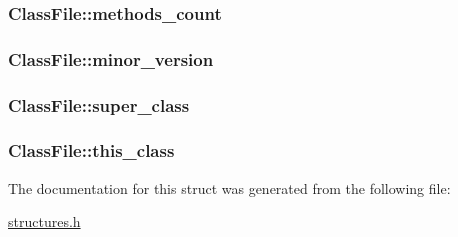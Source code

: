 \subsubsection[{\texorpdfstring{methods\+\_\+count}{methods_count}}]{ Class\+File\+::methods\+\_\+count}\hypertarget{structClassFile_aacfb45d4af64216324b1ae5269c870d5}{}\label{structClassFile_aacfb45d4af64216324b1ae5269c870d5}
\subsubsection[{\texorpdfstring{minor\+\_\+version}{minor_version}}]{ Class\+File\+::minor\+\_\+version}\hypertarget{structClassFile_af0db7b0ea01cb9cea2cee177ca81df09}{}\label{structClassFile_af0db7b0ea01cb9cea2cee177ca81df09}
\subsubsection[{\texorpdfstring{super\+\_\+class}{super_class}}]{ Class\+File\+::super\+\_\+class}\hypertarget{structClassFile_a5f6c11c0ccb02fd992b5c102725253ec}{}\label{structClassFile_a5f6c11c0ccb02fd992b5c102725253ec}
\subsubsection[{\texorpdfstring{this\+\_\+class}{this_class}}]{ Class\+File\+::this\+\_\+class}\hypertarget{structClassFile_a2d33db0a560a71b94bc572dd1e4ec03a}{}\label{structClassFile_a2d33db0a560a71b94bc572dd1e4ec03a}


The documentation for this struct was generated from the following file\+:\begin{DoxyCompactItemize}
\item 
\hyperlink{structures_8h}{structures.\+h}\end{DoxyCompactItemize}
